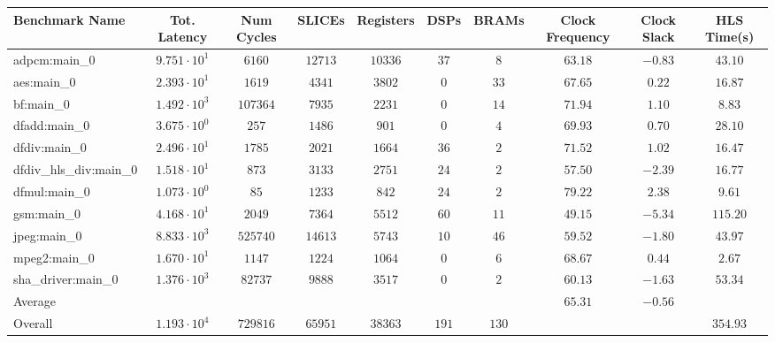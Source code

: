 \begin{tabular}{|l|c|c|c|c|c|c|c|c|c|}
\hline
Benchmark Name          & Tot. Latency           & Num Cycles & SLICEs    & Registers & DSPs    & BRAMs   & Clock Frequency & Clock Slack & HLS Time(s) \\
\hline
adpcm:main\_0           & $ 9.751 \cdot 10^{1} $ & $ 6160   $ & $ 12713 $ & $ 10336 $ & $ 37  $ & $ 8   $ & $ 63.18       $ & $ -0.83   $ & $ 43.10   $ \\
aes:main\_0             & $ 2.393 \cdot 10^{1} $ & $ 1619   $ & $ 4341  $ & $ 3802  $ & $ 0   $ & $ 33  $ & $ 67.65       $ & $ 0.22    $ & $ 16.87   $ \\
bf:main\_0              & $ 1.492 \cdot 10^{3} $ & $ 107364 $ & $ 7935  $ & $ 2231  $ & $ 0   $ & $ 14  $ & $ 71.94       $ & $ 1.10    $ & $ 8.83    $ \\
dfadd:main\_0           & $ 3.675 \cdot 10^{0} $ & $ 257    $ & $ 1486  $ & $ 901   $ & $ 0   $ & $ 4   $ & $ 69.93       $ & $ 0.70    $ & $ 28.10   $ \\
dfdiv:main\_0           & $ 2.496 \cdot 10^{1} $ & $ 1785   $ & $ 2021  $ & $ 1664  $ & $ 36  $ & $ 2   $ & $ 71.52       $ & $ 1.02    $ & $ 16.47   $ \\
dfdiv\_hls\_div:main\_0 & $ 1.518 \cdot 10^{1} $ & $ 873    $ & $ 3133  $ & $ 2751  $ & $ 24  $ & $ 2   $ & $ 57.50       $ & $ -2.39   $ & $ 16.77   $ \\
dfmul:main\_0           & $ 1.073 \cdot 10^{0} $ & $ 85     $ & $ 1233  $ & $ 842   $ & $ 24  $ & $ 2   $ & $ 79.22       $ & $ 2.38    $ & $ 9.61    $ \\
gsm:main\_0             & $ 4.168 \cdot 10^{1} $ & $ 2049   $ & $ 7364  $ & $ 5512  $ & $ 60  $ & $ 11  $ & $ 49.15       $ & $ -5.34   $ & $ 115.20  $ \\
jpeg:main\_0            & $ 8.833 \cdot 10^{3} $ & $ 525740 $ & $ 14613 $ & $ 5743  $ & $ 10  $ & $ 46  $ & $ 59.52       $ & $ -1.80   $ & $ 43.97   $ \\
mpeg2:main\_0           & $ 1.670 \cdot 10^{1} $ & $ 1147   $ & $ 1224  $ & $ 1064  $ & $ 0   $ & $ 6   $ & $ 68.67       $ & $ 0.44    $ & $ 2.67    $ \\
sha\_driver:main\_0     & $ 1.376 \cdot 10^{3} $ & $ 82737  $ & $ 9888  $ & $ 3517  $ & $ 0   $ & $ 2   $ & $ 60.13       $ & $ -1.63   $ & $ 53.34   $ \\
\hline
Average                 & $                    $ & $        $ & $       $ & $       $ & $     $ & $     $ & $ 65.31       $ & $ -0.56   $ & $         $ \\
\hline
Overall                 & $ 1.193 \cdot 10^{4} $ & $ 729816 $ & $ 65951 $ & $ 38363 $ & $ 191 $ & $ 130 $ & $             $ & $         $ & $ 354.93  $ \\
\hline
\end{tabular}
